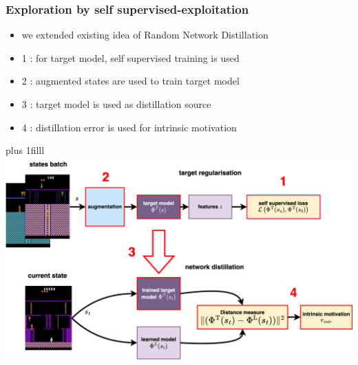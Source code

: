 \documentclass{beamer}
\begin{document}
\begin{frame}
  \frametitle{Exploration by self supervised-exploitation}

  \begin{itemize}
    \item we extended existing idea of Random Network Distillation
    \item {\color{red} 1 : } for target model, self supervised training is used
    \item {\color{red} 2 : } augmented states are used to train target model
    \item {\color{red} 3 : } target model is used as distillation source
    \item {\color{red} 4 : } distillation error is used for intrinsic motivation
  \end{itemize} 

  \vskip 0pt plus 1filll 
    \centering
    \includegraphics[scale=0.4]{../diagrams/cnd/cnd-cnd-4.png}

\end{frame}
\end{document}
